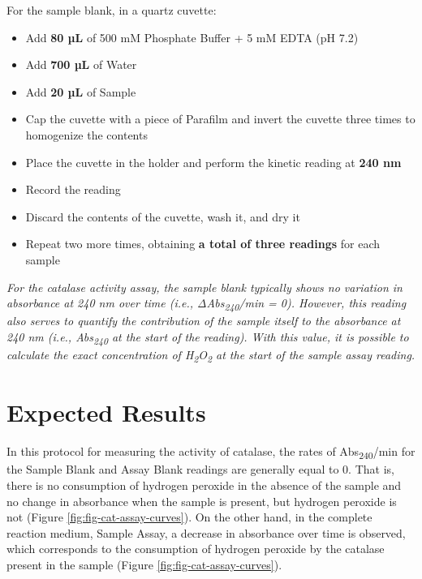 \documentclass[
  9pt,
  american,
  a5paper,
  extrafontsizes,onecolumn,openright
  ]{memoir}
\providecommand{\tightlist}{%
  \setlength{\itemsep}{0pt}\setlength{\parskip}{0pt}}
\newlength{\rf}
\begin{document}
For the sample blank, in a quartz cuvette:

\begin{itemize}
\tightlist
\item
  Add \textbf{80 µL} of 500 mM Phosphate Buffer + 5 mM EDTA (pH 7.2)
\item
  Add \textbf{700 µL} of Water
\item
  Add \textbf{20 µL} of Sample
\item
  Cap the cuvette with a piece of Parafilm and invert the cuvette three times to homogenize the contents
\item
  Place the cuvette in the holder and perform the kinetic reading at \textbf{240 nm}
\item
  Record the reading
\item
  Discard the contents of the cuvette, wash it, and dry it
\item
  Repeat two more times, obtaining \textbf{a total of three readings} for each sample
\end{itemize}

\begin{greybox}[frametitle = Note]
\emph{For the catalase activity assay, the sample blank typically shows no variation in absorbance at 240 nm over time (i.e., ΔAbs\textsubscript{240}/min = 0). However, this reading also serves to quantify the contribution of the sample itself to the absorbance at 240 nm (i.e., Abs\textsubscript{240} at the start of the reading). With this value, it is possible to calculate the exact concentration of H\textsubscript{2}O\textsubscript{2} at the start of the sample assay reading.}

\end{greybox}

\section{Expected Results}\label{expected-results}

In this protocol for measuring the activity of catalase, the rates of Abs\textsubscript{240}/min for the Sample Blank and Assay Blank readings are generally equal to 0. That is, there is no consumption of hydrogen peroxide in the absence of the sample and no change in absorbance when the sample is present, but hydrogen peroxide is not (Figure \ref{fig:fig-cat-assay-curves}). On the other hand, in the complete reaction medium, Sample Assay, a decrease in absorbance over time is observed, which corresponds to the consumption of hydrogen peroxide by the catalase present in the sample (Figure \ref{fig:fig-cat-assay-curves}).
\end{document}
